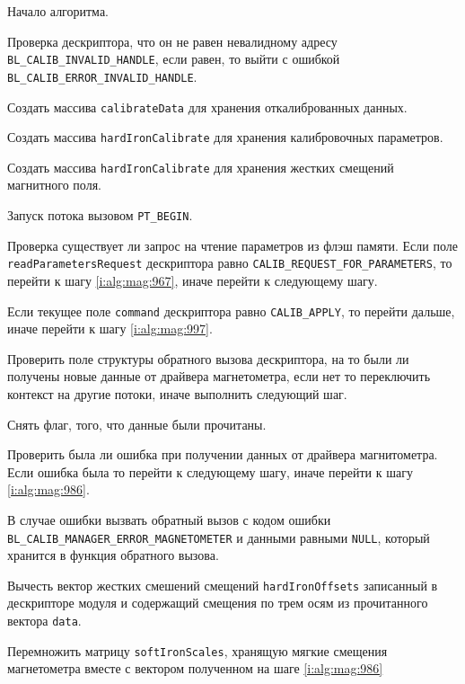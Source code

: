 \begin{enumerate_step}
    \item Начало алгоритма.
    \item Проверка дескриптора, что он не равен невалидному адресу \lstinline|BL_CALIB_INVALID_HANDLE|, если равен, то выйти с ошибкой
    \lstinline|BL_CALIB_ERROR_INVALID_HANDLE|.
    \item Создать массива \lstinline|calibrateData| для хранения откалиброванных данных.
    \item Создать массива \lstinline|hardIronCalibrate| для хранения калибровочных параметров.
    \item Создать массива \lstinline|hardIronCalibrate| для хранения жестких смещений магнитного поля.
    \item Запуск потока вызовом \lstinline|PT_BEGIN|.
    \item \label{i:alg:mag:965} Проверка существует ли запрос на чтение параметров из флэш памяти. Если поле \lstinline|readParametersRequest| дескриптора равно \lstinline|CALIB_REQUEST_FOR_PARAMETERS|,
    то перейти к шагу \ref{i:alg:mag:967}, иначе перейти к следующему шагу.
    \item \label{i:alg:mag:974} Если текущее поле \lstinline|command| дескриптора равно \lstinline|CALIB_APPLY|, то перейти дальше, иначе перейти к шагу
    \ref{i:alg:mag:997}.
    \item Проверить поле структуры обратного вызова дескриптора, на то были ли получены новые данные от драйвера магнетометра, 
    если нет то переключить контекст на другие потоки, иначе выполнить следующий шаг.
    \item Снять флаг, того, что данные были прочитаны.
    \item Проверить была ли ошибка при получении данных от драйвера магнитометра. Если ошибка была то перейти к следующему шагу, иначе перейти к шагу \ref{i:alg:mag:986}.
    \item В случае ошибки вызвать обратный вызов с кодом ошибки \lstinline|BL_CALIB_MANAGER_ERROR_MAGNETOMETER| и данными равными \lstinline|NULL|,
    который хранится в функция обратного вызова.
    \item \label{i:alg:mag:986} Вычесть вектор жестких смешений смещений \lstinline|hardIronOffsets| записанный в дескрипторе модуля и содержащий смещения по трем осям из прочитанного вектора \lstinline|data|.
    \item \label{i:alg:mag:991} Перемножить матрицу \lstinline|softIronScales|, хранящую мягкие смещения магнетометра вместе с вектором полученном на шаге \ref{i:alg:mag:986}

\end{enumerate_step}

